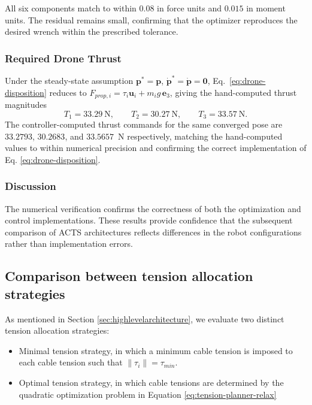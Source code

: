 All six components match to within $0.08$ in force units and $0.015$ in moment units. The residual remains small, confirming that the optimizer reproduces the desired wrench within the prescribed tolerance.

\subsubsection{Required Drone Thrust}
Under the steady-state assumption $\mathbf p^* = \mathbf p$, $\dot{\mathbf p}^* = \dot{\mathbf p} = \mathbf 0$,
Eq.~\eqref{eq:drone-disposition} reduces to $F_{prop,i} = \tau_i \mathbf u_i + m_i g\, \mathbf e_3$, giving the hand-computed thrust magnitudes
\begin{equation}
T_1 = 33.29~\text{N}, \qquad T_2 = 30.27~\text{N}, \qquad T_3 = 33.57~\text{N}.
\end{equation}
The controller-computed thrust commands for the same converged pose are $33.2793$, $30.2683$, and $33.5657$~N respectively, matching the hand-computed values to within numerical precision and confirming the correct implementation of Eq. \eqref{eq:drone-disposition}.

\subsubsection{Discussion}
The numerical verification confirms the correctness of both the optimization and control implementations. These results provide confidence that the subsequent comparison of ACTS architectures reflects differences in the robot configurations rather than implementation errors.

\subsection{Comparison between tension allocation strategies}
\label{sec:allocationStrategies}
As mentioned in Section \ref{sec:highlevelarchitecture}, we evaluate two distinct tension allocation strategies:
\begin{itemize}
    \item Minimal tension strategy, in which a minimum cable tension is imposed to each cable tension such that $\|\tau_i \| = \tau_{min}$.
    \item Optimal tension strategy, in which cable tensions are determined by the quadratic optimization problem in Equation \eqref{eq:tension-planner-relax}
\end{itemize}

